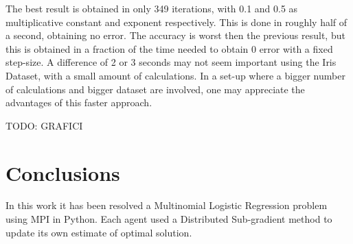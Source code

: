 \documentclass[a4paper,11pt,oneside]{book}
\begin{document}
\noindent The best result is obtained in only 349 iterations, with 0.1 and 0.5 as multiplicative constant and exponent respectively. This is done in roughly half of a second, obtaining no error. The accuracy is worst then the previous result, but this is obtained in a fraction of the time needed to obtain 0 error with a fixed step-size. A difference of 2 or 3 seconds may not seem important using the Iris Dataset, with a small amount of calculations. In a set-up where a bigger number of calculations and bigger dataset are involved, one may appreciate the advantages of this faster approach.




TODO: GRAFICI

\chapter*{Conclusions} %
In this work it has been resolved a Multinomial Logistic Regression problem using MPI in Python. Each agent used a Distributed Sub-gradient method to update its own estimate of optimal solution.


{}
   
\end{document}
